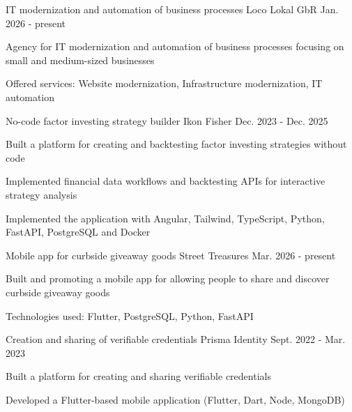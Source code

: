 


\begin{cventries}
\cventry
{IT modernization and automation of business processes} %
{Loco Lokal GbR} %
{} %
{Jan. 2026 - present} %
{ %
\begin{cvitems}
\item {Agency for IT modernization and automation of business processes focusing on small and medium-sized businesses}
\item {Offered services: Website modernization, Infrastructure modernization, IT automation}
\end{cvitems}
}

\cventry
{No-code factor investing strategy builder} %
{Ikon Fisher} %
{} %
{Dec. 2023 - Dec. 2025} %
{ %
\begin{cvitems}
\item {Built a platform for creating and backtesting factor investing strategies without code}
\item {Implemented financial data workflows and backtesting APIs for interactive strategy analysis}
\item {Implemented the application with Angular, Tailwind, TypeScript, Python, FastAPI, PostgreSQL and Docker}
\end{cvitems}
}
\cventry
{Mobile app for curbside giveaway goods} %
{Street Treasures} %
{} %
{Mar. 2026 - present} %
{ %
\begin{cvitems}
\item {Built and promoting a mobile app for allowing people to share and discover curbside giveaway goods}
\item {Technologies used: Flutter, PostgreSQL, Python, FastAPI}
\end{cvitems}
}
\cventry
{Creation and sharing of verifiable credentials} %
{Prisma Identity} %
{} %
{Sept. 2022 - Mar. 2023} %
{ %
\begin{cvitems}
\item {Built a platform for creating and sharing verifiable credentials}
\item {Developed a Flutter-based mobile application (Flutter, Dart, Node, MongoDB)}
\end{cvitems}
}


\end{cventries}
